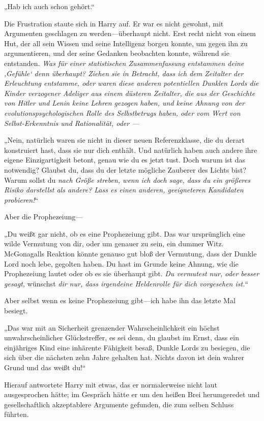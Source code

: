 {„Hab ich auch schon gehört.“

Die Frustration staute sich in Harry auf. Er war es nicht gewohnt, mit Argumenten geschlagen zu werden—überhaupt nicht. Erst recht nicht von einem Hut, der all sein Wissen und seine Intelligenz borgen konnte, um gegen ihn zu argumentieren, und der seine Gedanken beobachten konnte, während sie entstanden. \emph{Was für einer statistischen Zusammenfassung entstammen deine ‚Gefühle` denn überhaupt? Ziehen sie in Betracht, dass ich dem Zeitalter der Erleuchtung entstamme, oder waren diese anderen potentiellen Dunklen Lords die Kinder verzogener Adeliger aus einem düsteren Zeitalter, die aus der Geschichte von Hitler und Lenin keine Lehren gezogen haben, und keine Ahnung von der evolutionspsychologischen Rolle des Selbstbetrugs haben, oder vom Wert von Selbst-Erkenntnis und Rationalität, oder —}

„Nein, natürlich waren sie nicht in dieser neuen Referenzklasse, die du derart konstruiert hast, dass sie nur dich enthält. Und natürlich haben auch andere ihre eigene Einzigartigkeit betont, genau wie du es jetzt tust. Doch warum ist das notwendig? Glaubst du, dass du der letzte mögliche Zauberer des Lichts bist? Warum sollst du \emph{nach Größe streben, wenn ich doch sage, dass du ein größeres Risiko darstellst als andere? Lass es einen anderen, geeigneteren Kandidaten probieren!}“

Aber die Prophezeiung—

„Du weißt gar nicht, ob es eine Prophezeiung gibt. Das war ursprünglich eine wilde Vermutung von dir, oder um genauer zu sein, ein dummer Witz. McGonagalls Reaktion könnte genauso gut bloß der Vermutung, dass der Dunkle Lord noch lebe, gegolten haben. Du hast im Grunde keine Ahnung, wie die Prophezeiung lautet oder ob es sie überhaupt gibt. \emph{Du vermutest nur, oder besser gesagt,} wünschst \emph{dir nur, dass irgendeine Heldenrolle für dich vorgesehen ist.}“

Aber selbst wenn es keine Prophezeiung gibt—ich habe ihn das letzte Mal besiegt.

„Das war mit an Sicherheit grenzender Wahrscheinlichkeit ein höchst unwahrscheinlicher Glückstreffer, es sei denn, du glaubst im Ernst, dass ein einjähriges Kind eine inhärente Fähigkeit besaß, Dunkle Lords zu besiegen, die sich über die nächsten zehn Jahre gehalten hat. Nichts davon ist dein wahrer Grund und das weißt du!“

Hierauf antwortete Harry mit etwas, das er normalerweise nicht laut ausgesprochen hätte; im Gespräch hätte er um den heißen Brei herumgeredet und gesellschaftlich akzeptablere Argumente gefunden, die zum selben Schluss führten.

}
